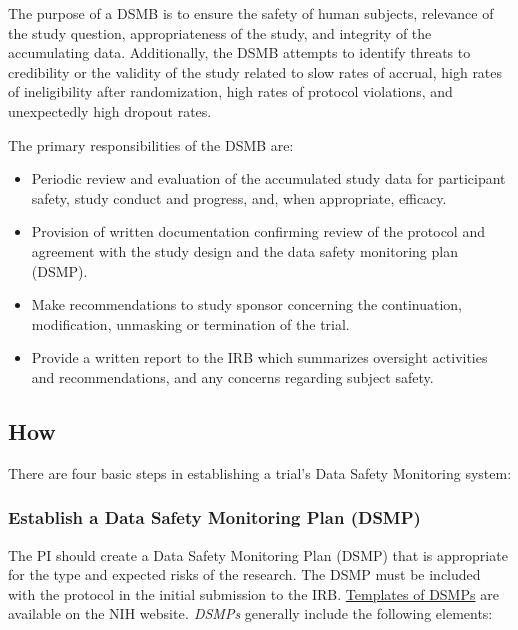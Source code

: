\documentclass[]{book}
\providecommand{\tightlist}{%
  \setlength{\itemsep}{0pt}\setlength{\parskip}{0pt}}
\begin{document}
The purpose of a DSMB is to ensure the safety of human subjects,
relevance of the study question, appropriateness of the study, and
integrity of the accumulating data. Additionally, the DSMB attempts to
identify threats to credibility or the validity of the study related to
slow rates of accrual, high rates of ineligibility after randomization,
high rates of protocol violations, and unexpectedly high dropout rates.

The primary responsibilities of the DSMB are:

\begin{itemize}
\tightlist
\item
  Periodic review and evaluation of the accumulated study data for
  participant safety, study conduct and progress, and, when appropriate,
  efficacy.
\item
  Provision of written documentation confirming review of the protocol
  and agreement with the study design and the data safety monitoring
  plan (DSMP).
\item
  Make recommendations to study sponsor concerning the continuation,
  modification, unmasking or termination of the trial.
\item
  Provide a written report to the IRB which summarizes oversight
  activities and recommendations, and any concerns regarding subject
  safety.
\end{itemize}

\subsection{How}\label{how-9}

There are four basic steps in establishing a trial's Data Safety
Monitoring system:

\subsubsection{Establish a Data Safety Monitoring Plan
(DSMP)}\label{establish-a-data-safety-monitoring-plan-dsmp}

The PI should create a Data Safety Monitoring Plan (DSMP) that is
appropriate for the type and expected risks of the research. The DSMP
must be included with the protocol in the initial submission to the IRB.
\href{https://www.nia.nih.gov/research/dgcg/clinical-research-study-investigators-toolbox/data-and-safety-monitorin}{Templates
of DSMPs} are available on the NIH website\emph{. DSMPs} generally
include the following elements:
\end{document}
